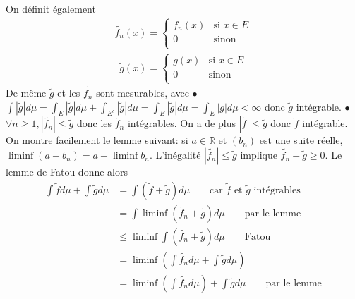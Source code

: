 \documentclass{report}
\begin{document}
On définit également  $$\begin{aligned}
  \widetilde{f_n}(x)=
  \begin{cases}
    f_n(x) & \text{si }  x\in E \\
    0 & \text{sinon }  \\
  \end{cases}
\end{aligned}$$ $$\begin{aligned}
  \widetilde{g}(x)=
  \begin{cases}
    g(x) & \text{si }  x\in E \\
    0 & \text{sinon }  \\
  \end{cases}
\end{aligned}$$\newline
De même $\widetilde{g}$ et les $\widetilde{f_n}$ sont mesurables, avec \newline
$\bullet$ $\int |\widetilde{g}| d\mu  = \int_E  |\widetilde{g}| d\mu + \int_{E^c}  |\widetilde{g}| d\mu =\int_E  |\widetilde{g}| d\mu = \int_E  |g| d\mu <\infty $ donc $\widetilde{g}$ intégrable. \newline
$\bullet$ $\forall n\geq 1, |\widetilde{f_n}|\leq \widetilde{g}$ donc les $\widetilde{f_n}$ intégrables. On a de plus $|\widetilde{f}|\leq \widetilde{g} $ donc $\widetilde{f}$ intégrable. \newline \newline
On montre facilement le lemme suivant: si $a\in \mathbb R$ et $(b_n)$ est une suite réelle, $\liminf (a+b_n) =a + \liminf b_n$. \newline
L'inégalité $|\widetilde{f_n}|\leq \widetilde{g}$ implique $\widetilde{f_n} + \widetilde{g}\geq 0$.
Le lemme de Fatou donne alors $$\begin{aligned} \int \widetilde{f} d\mu + \int \widetilde{g} d\mu  
&=  \int \left(\widetilde{f} +  \widetilde{g}\right) d\mu \quad \quad \text{car $\widetilde{f}$ et $\widetilde{g}$ intégrables}\\
&= \int \liminf \left(\widetilde{f_n} + \widetilde{g} \right) d\mu \quad \quad \text{par le lemme}\\
&\leq \liminf  \int \left(\widetilde{f_n} + \widetilde{g} \right) d\mu  \quad \quad \text{Fatou }\\
&= \liminf\left(  \int \widetilde{f_n} d\mu  +  \int \widetilde{g} d\mu \right) \\
&= \liminf\left(  \int \widetilde{f_n} d\mu  \right) + \int \widetilde{g} d\mu \quad \quad \text{par le lemme}
\end{aligned}$$\newline
\end{document}
